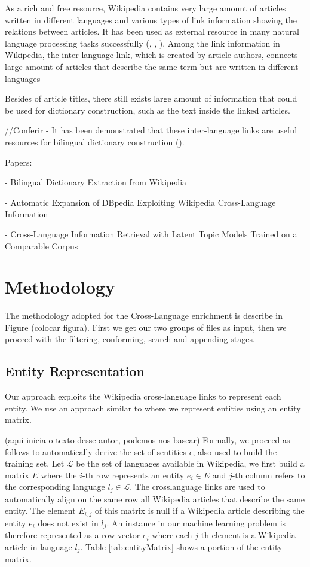 \documentclass[10pt,a4paper]{llncs}
\begin{document}
As a rich and free resource, Wikipedia contains very large amount of articles written in different languages and various types of link information showing the relations between articles. It has been used as external resource in many natural language processing tasks successfully (\cite{buscaldi_rosso}, \cite{mihalcea}, \cite{erdmann}). 
Among the link information in Wikipedia, the inter-language link, which is created by article authors, connects large amount of articles that describe the same term but are written in different languages

Besides of article titles, there still exists large amount of information that could be used for dictionary construction, such as the text inside the linked articles.

//Conferir - It has been demonstrated that these inter-language links are useful resources for bilingual dictionary construction (\cite{erdmann}).

Papers:

- Bilingual Dictionary Extraction from Wikipedia

- Automatic Expansion of DBpedia Exploiting Wikipedia Cross-Language Information

- Cross-Language Information Retrieval with Latent Topic Models Trained on a Comparable Corpus

\section{Methodology}

The methodology adopted for the Cross-Language enrichment is describe in Figure (colocar figura). First we get our two groups of files as input, then we proceed with the filtering, conforming, search and appending stages.

\subsection{Entity Representation}

Our approach exploits the Wikipedia cross-language links to represent each entity. We use an approach similar to \cite{aprosio} where we represent entities using an entity matrix. 

(aqui inicia o texto desse autor, podemos nos basear)
Formally, we proceed as follows to automatically derive the set of sentities $\epsilon$, also used to build the training set. Let $\mathcal{L}$ be the set of languages available in Wikipedia, we first build a matrix $E$ where the $i$-th row represents an entity $e_i \in E$ and $j$-th column refers to the corresponding language $l_j \in \mathcal{L}$. The crosslanguage links are used to automatically align on the same row all Wikipedia articles that describe the same entity. The element $E_{i,j}$ of this matrix is null if a Wikipedia article describing the entity $e_i$ does not exist in $l_j$. An instance in our machine learning problem is therefore represented as a row vector $e_i$ where each $j$-th element is a Wikipedia article in language $l_j$. Table \ref{tab:entityMatrix} shows a portion of the entity matrix.
\end{document}
